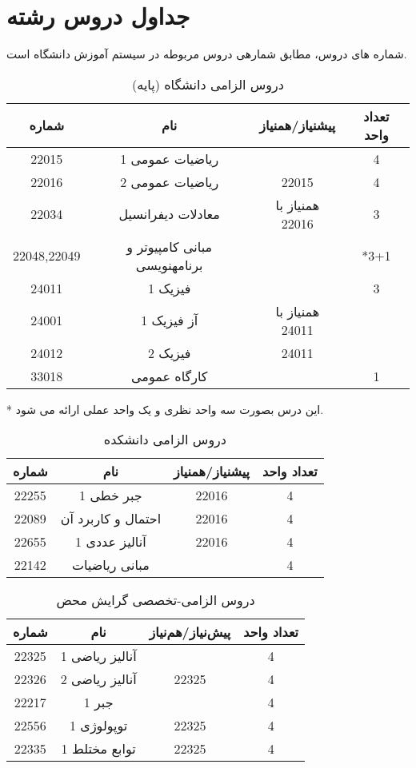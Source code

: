 \documentclass{article}
\begin{document}
	\section{
	جداول دروس رشته
}
شماره های دروس، مطابق شمارهی دروس مربوطه در سیستم آموزش دانشگاه است.
\begin{table}[H]
\begin{center}

	\begin{tabular}{|c|c|c|c|}
		\hline
		شماره & نام & پیشنیاز/همنیاز & تعداد واحد  \\
		\hline
		22015 & ریاضیات عمومی 1 &  & 4 \\
		\hline
		22016 & ریاضیات عمومی 2 & 22015 & 4 \\
		\hline
		22034 & معادلات دیفرانسیل & همنیاز با 22016 & 3 \\
		\hline
		22048,22049 & مبانی کامپیوتر و برنامهنویسی &  & *3+1 \\
		\hline
		24011 & فیزیک 1 &  & 3 \\
		\hline
		24001 & آز فیزیک 1 & همنیاز با 24011 &  \\
		\hline
		24012 & فیزیک 2 & 24011 &  \\
		\hline
		33018 & کارگاه عمومی &  & 1 \\
		\hline
	\end{tabular}
    \caption{\label{math-t1}
دروس الزامی دانشگاه (پایه)
    }
    \end{center}
    \end{table}
* این درس بصورت سه واحد نظری و یک واحد عملی ارائه می شود.
\begin{table}[H]
\begin{center}
\begin{tabular}{|c|c|c|c|}
	\hline
	شماره & نام & پیشنیاز/همنیاز & تعداد واحد \\
	\hline
	22255 & جبر خطی 1 & 22016 & 4 \\
	\hline
	22089 & احتمال و کاربرد آن & 22016 & 4 \\
	\hline
	22655 & آنالیز عددی 1 & 22016 & 4 \\
	\hline
	22142 & مبانی ریاضیات &  & 4 \\
	\hline
    \end{tabular}
    \caption{\label{math-t2}
دروس الزامی دانشکده
    }
    \end{center}
    \end{table}
    \begin{table}[H]
    	\begin{center}
\begin{tabular}{|c|c|c|c|}
	\hline
	شماره & نام & پیش‌نیاز/هم‌نیاز & تعداد واحد \\
	\hline
	22325 & آنالیز ریاضی 1 &   & 4 \\
	\hline
	22326 & آنالیز ریاضی 2 & 22325 & 4 \\
	\hline
	22217 & جبر 1 &  & 4 \\
	\hline
	22556 & توپولوژی 1 & 22325 & 4 \\
	\hline
	22335 & توابع مختلط 1 & 22325 & 4 \\
	\hline
\end{tabular}
        \caption{\label{math-t3-1}
دروس الزامی-تخصصی گرایش محض
    }
    \end{center}
\end{table}
\end{document}
